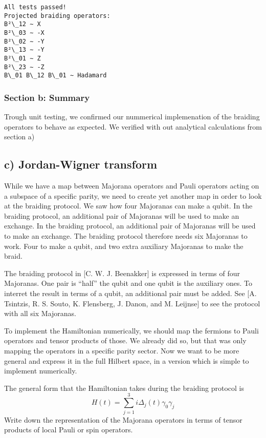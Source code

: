\documentclass[11pt,landscape]{article}
\begin{document}
    \begin{Verbatim}[commandchars=\\\{\}]
All tests passed!
Projected braiding operators:
B²\_12 ∼ X
B²\_03 ∼ -X
B²\_02 ∼ -Y
B²\_13 ∼ -Y
B²\_01 ∼ Z
B²\_23 ∼ -Z
B\_01 B\_12 B\_01 ∼ Hadamard
    \end{Verbatim}

    \subsubsection{Section b: Summary}\label{section-b-summary}

Trough unit testing, we confirmed our nummerical implemenation of the
braiding operators to behave as expected. We verified with out
analytical calculations from section a)

    \subsection{c) Jordan-Wigner transform}\label{c-jordan-wigner-transform}

While we have a map between Majorana operators and Pauli operators
acting on a subspace of a specific parity, we need to create yet another
map in order to look at the braiding protocol. We saw how four Majoranas
can make a qubit. In the braiding protocol, an additional pair of
Majoranas will be used to make an exchange. In the braiding protocol, an
additional pair of Majoranas will be used to make an exchange. The
braiding protocol therefore needs six Majoranas to work. Four to make a
qubit, and two extra auxiliary Majoranas to make the braid.

The braiding protocol in {[}C. W. J. Beenakker{]} is expressed in terms
of four Majoranas. One pair is ``half'' the qubit and one qubit is the
auxiliary ones. To interret the result in terms of a qubit, an
additional pair must be added. See {[}A. Tsintzis, R. S. Souto, K.
Flensberg, J. Danon, and M. Leijnse{]} to see the protocol with all six
Majoranas.

To implement the Hamiltonian numerically, we should map the fermions to
Pauli operators and tensor products of those. We already did so, but
that was only mapping the operators in a specific parity sector. Now we
want to be more general and express it in the full Hilbert space, in a
version which is simple to implement numerically.

The general form that the Hamiltonian takes during the braiding protocol
is \[
H(t) = ∑_{j=1}^{3} iΔ_j (t) γ_0γ_j
\] Write down the representation of the Majorana operators in terms of
tensor products of local Pauli or spin operators.
\end{document}

